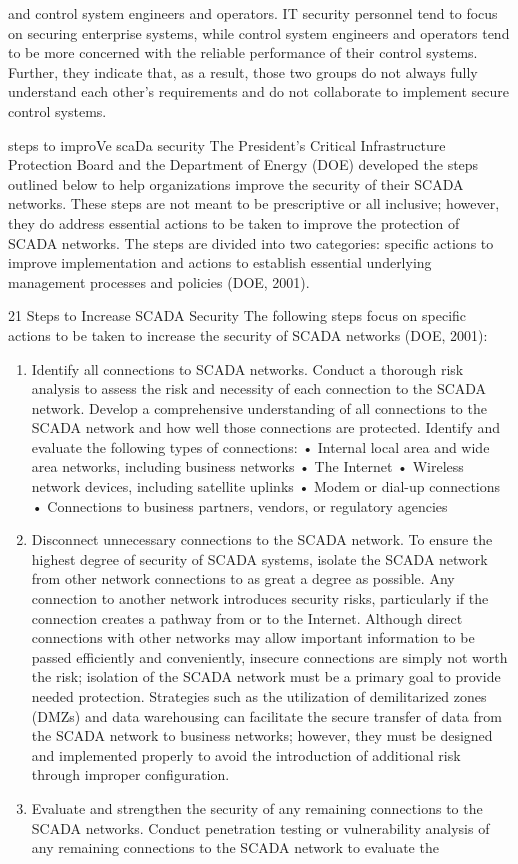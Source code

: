 \documentclass{article}
\begin{document}
and control system engineers and operators. IT security personnel tend
to focus on securing enterprise systems, while control system engineers
and operators tend to be more concerned with the reliable performance of
their control systems. Further, they indicate that, as a result, those
two groups do not always fully understand each other's requirements and
do not collaborate to implement secure control systems.

steps to improVe scaDa security The President's Critical Infrastructure
Protection Board and the Department of Energy (DOE) developed the steps
outlined below to help organizations improve the security of their SCADA
networks. These steps are not meant to be prescriptive or all inclusive;
however, they do address essential actions to be taken to improve the
protection of SCADA networks. The steps are divided into two categories:
specific actions to improve implementation and actions to establish
essential underlying management processes and policies (DOE, 2001).

21 Steps to Increase SCADA Security The following steps focus on
specific actions to be taken to increase the security of SCADA networks
(DOE, 2001):

\begin{enumerate}
\item
  Identify all connections to SCADA networks. Conduct a thorough risk
  analysis to assess the risk and necessity of each connection to the
  SCADA network. Develop a comprehensive understanding of all
  connections to the SCADA network and how well those connections are
  protected. Identify and evaluate the following types of connections: •
  Internal local area and wide area networks, including business
  networks • The Internet • Wireless network devices, including
  satellite uplinks • Modem or dial-up connections • Connections to
  business partners, vendors, or regulatory agencies
\item
  Disconnect unnecessary connections to the SCADA network. To ensure the
  highest degree of security of SCADA systems, isolate the SCADA network
  from other network connections to as great a degree as possible. Any
  connection to another network introduces security risks, particularly
  if the connection creates a pathway from or to the Internet. Although
  direct connections with other networks may allow important information
  to be passed efficiently and conveniently, insecure connections are
  simply not worth the risk; isolation of the SCADA network must be a
  primary goal to provide needed protection. Strategies such as the
  utilization of demilitarized zones (DMZs) and data warehousing can
  facilitate the secure transfer of data from the SCADA network to
  business networks; however, they must be designed and implemented
  properly to avoid the introduction of additional risk through improper
  configuration.
\item
  Evaluate and strengthen the security of any remaining connections to
  the SCADA networks. Conduct penetration testing or vulnerability
  analysis of any remaining connections to the SCADA network to evaluate
  the
\end{enumerate}
\end{document}

